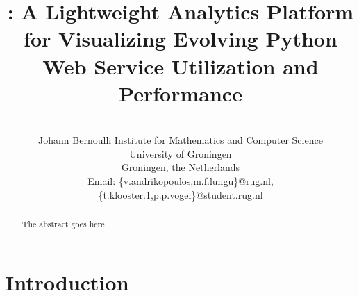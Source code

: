 \documentclass[conference]{IEEEtran}
\begin{document}
%
\title{\tool: A Lightweight Analytics Platform for Visualizing Evolving Python Web Service Utilization and Performance}



\author{
\\
Johann Bernoulli Institute for Mathematics and Computer Science\\
University of Groningen\\
Groningen, the Netherlands\\
Email: \{v.andrikopoulos,m.f.lungu\}@rug.nl, \{t.klooster.1,p.p.vogel\}@student.rug.nl
}

\maketitle

\begin{abstract}
The abstract goes here.
\end{abstract}


\IEEEpeerreviewmaketitle



\section{Introduction}
\end{document}
